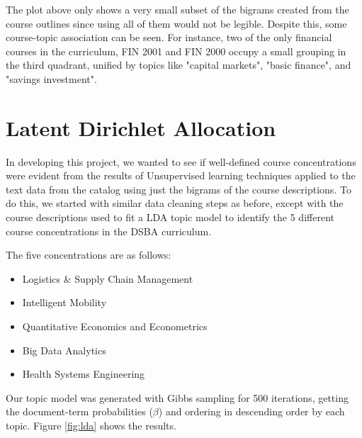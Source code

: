 The plot above only shows a very small subset of the bigrams created from the course outlines since using all of them would not be legible.  Despite this,  
some course-topic association can be seen.  For instance, two of the only financial courses in the curriculum, FIN 2001 and FIN 2000 occupy a small grouping in 
the third quadrant, unified by topics like "capital markets", "basic finance", and "savings investment". 

\section{Latent Dirichlet Allocation}

In developing this project, we wanted to see if well-defined course concentrations were evident from the results of Unsupervised learning techniques applied 
to the text data from the catalog using just the bigrams of the course descriptions.  To do this,  we started with similar data cleaning steps as before, except 
with the course descriptions used to fit a LDA \cite{lda_pap} topic model to identify the 5 different course concentrations in the DSBA curriculum. 

The five concentrations are as follows:   
\begin{itemize}
	\item{Logistics \& Supply Chain Management }
	\item{Intelligent Mobility}
	\item{Quantitative Economics and Econometrics}
	\item{Big Data Analytics}
	\item{Health Systems Engineering}

\end{itemize}

Our topic model was generated with Gibbs sampling for 500 iterations,  getting the document-term probabilities ($\beta$) and ordering in descending order by 
each topic. Figure \ref{fig:lda} shows the results.


